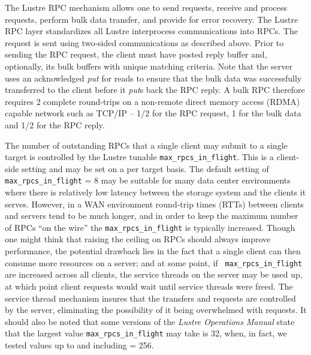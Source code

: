 \documentclass[]{sig-alternate}
\begin{document}
The Lustre RPC mechanism allows one to send requests, receive and process requests,
perform bulk data transfer, and provide for error recovery. The Lustre RPC layer standardizes all Lustre
interprocess communications into RPCs. The request is sent using two-sided communications as described above.
Prior to sending the RPC request, the client must have posted reply buffer and, optionally, its bulk buffers
with unique matching criteria. Note that the server uses an acknowledged {\it put} for reads to ensure that
the bulk data was successfully transferred to the client before it {\it put}s back the RPC reply.  A bulk RPC
therefore requires 2 complete round-trips on a non-remote direct memory access (RDMA) capable network such as
TCP/IP -- 1/2 for the RPC request, 1 for the bulk data and 1/2 for the RPC reply.

The number of outstanding RPCs that a single client may submit to a single target is controlled by the Lustre
tunable {\tt max\_rpcs\_in\_flight}. This is a client-side setting and may be set on a per target basis. The
default setting of {\tt max\_rpcs\_in\_flight} = 8 may be suitable for many data center environments where
there is relatively low latency between the storage system and the clients it serves. However, in a WAN
environment round-trip times (RTTs) between clients and servers tend to be much longer, and in order to keep
the maximum number of RPCs ``on the wire'' the {\tt max\_rpcs\_in\_flight} is typically increased. Though one
might think that raising the ceiling on RPCs should always improve performance, the potential drawback lies in
the fact that a single client can then consume more resources on a server; and at some point, if {\tt
  max\_rpcs\_in\_flight} are increased across all clients, the service threads on the server may be used up,
at which point client requests would wait until service threads were freed. The service thread mechanism
insures that the transfers and requests are controlled by the server, eliminating the possibility of it being
overwhelmed with requests.  It should also be noted that some versions of the {\it Lustre Operations Manual}
\cite{LustreManual2012} state that the largest value {\tt max\_rpcs\_in\_flight} may take is 32,
when, in fact, we tested values up to and including  = 256.
\end{document}
